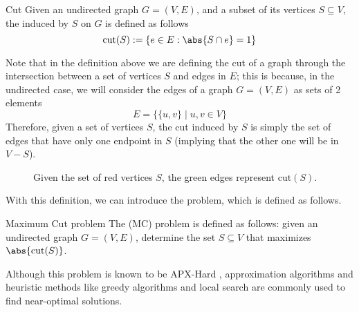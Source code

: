 \documentclass[a4paper, 12pt]{report}
\begin{document}
    \begin{frameddefn}{Cut}
        Given an undirected graph $G = (V, E)$, and a subset of its vertices $S \subseteq V$, the  induced by $S$ on $G$ is defined as follows $$\mathrm{cut}(S) := \{e \in E : \abs{S \cap e} = 1\}$$
    \end{frameddefn}

    Note that in the definition above we are defining the cut of a graph through the intersection between a set of vertices $S$ and edges in $E$; this is because, in the undirected case, we will consider the edges of a graph $G = (V, E)$ as sets of 2 elements $$E = \{\{u, v\} \mid u, v \in V\}$$ Therefore, given a set of vertices $S$, the cut induced by $S$ is simply the set of edges that have only one endpoint in $S$ (implying that the other one will be in $V - S$).

    \begin{figure}[H]
        \centering
        \caption{Given the set of red vertices $S$, the green edges represent $\mathrm{cut}(S)$.}
    \end{figure}

    With this definition, we can introduce the  problem, which is defined as follows.

    \begin{frameddefn}{Maximum Cut problem}
        The  (MC) problem is defined as follows: given an undirected graph $G = (V, E)$, determine the set $S \subseteq V$ that maximizes $\abs{\mathrm{cut}(S)}$.
    \end{frameddefn}

    Although this problem is known to be \textsf{APX-Hard} \cite{maxcut}, approximation algorithms and heuristic methods like greedy algorithms and local search are commonly used to find near-optimal solutions.
\end{document}
